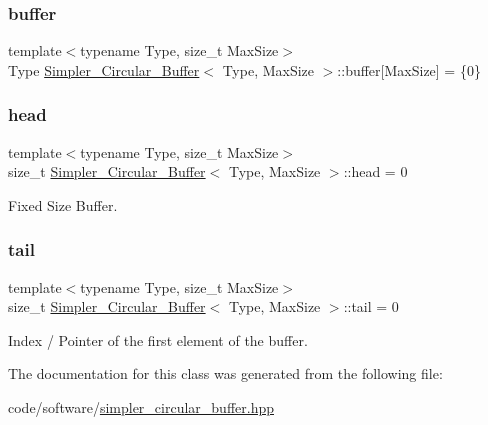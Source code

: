 \subsubsection{\texorpdfstring{buffer}{buffer}}
{\footnotesize\ttfamily template$<$typename Type, size\+\_\+t Max\+Size$>$ \\
Type \hyperlink{classSimpler__Circular__Buffer}{Simpler\+\_\+\+Circular\+\_\+\+Buffer}$<$ Type, Max\+Size $>$\+::buffer\mbox{[}Max\+Size\mbox{]} = \{0\}\hspace{0.3cm}{\ttfamily [private]}}

\mbox{\label{classSimpler__Circular__Buffer_aa6fea0e7b9d4b57aa825dfe11aec3c25}} 
\subsubsection{\texorpdfstring{head}{head}}
{\footnotesize\ttfamily template$<$typename Type, size\+\_\+t Max\+Size$>$ \\
size\+\_\+t \hyperlink{classSimpler__Circular__Buffer}{Simpler\+\_\+\+Circular\+\_\+\+Buffer}$<$ Type, Max\+Size $>$\+::head = 0\hspace{0.3cm}{\ttfamily [private]}}



Fixed Size Buffer. 

\mbox{\label{classSimpler__Circular__Buffer_a2833e67d4d6cfae68e71306037015642}} 
\subsubsection{\texorpdfstring{tail}{tail}}
{\footnotesize\ttfamily template$<$typename Type, size\+\_\+t Max\+Size$>$ \\
size\+\_\+t \hyperlink{classSimpler__Circular__Buffer}{Simpler\+\_\+\+Circular\+\_\+\+Buffer}$<$ Type, Max\+Size $>$\+::tail = 0\hspace{0.3cm}{\ttfamily [private]}}



Index / Pointer of the first element of the buffer. 



The documentation for this class was generated from the following file\+:\begin{DoxyCompactItemize}
\item 
code/software/\hyperlink{simpler__circular__buffer_8hpp}{simpler\+\_\+circular\+\_\+buffer.\+hpp}\end{DoxyCompactItemize}
